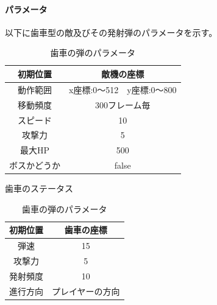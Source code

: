 \documentclass[a4paper,titlepage,11pt]{ltjsarticle}
\begin{document}
\paragraph{パラメータ}
以下に歯車型の敵及びその発射弾のパラメータを示す。
\begin{table}[H]
  \begin{minipage}[h]{.45\textwidth}
    \begin{center}
      \begin{tabular}{|c|c|}
				\hline
				初期位置 & 敵機の座標 \\ \hline
				動作範囲 & x座標:0～512　y座標:0～800 \\ \hline
				移動頻度 & 300フレーム毎 \\ \hline
				スピード & 10 \\ \hline
				攻撃力 & 5 \\ \hline
				最大HP & 500 \\ \hline
				ボスかどうか & false \\ \hline
      \end{tabular}
    \end{center}
    \caption{歯車のステータス}
    \label{}
  \end{minipage}
  \hfill
  \begin{minipage}[h]{.45\textwidth}
    \begin{center}
      \begin{tabular}{|c|c|}
				\hline
				初期位置 & 歯車の座標 \\ \hline
				弾速 & 15 \\ \hline
				攻撃力 & 5 \\ \hline
				発射頻度 & 10 \\ \hline
				進行方向 & プレイヤーの方向  \\ \hline 
      \end{tabular}
    \end{center}
    \caption{歯車の弾のパラメータ}
    \label{}
  \end{minipage}
\end{table}
\end{document}
